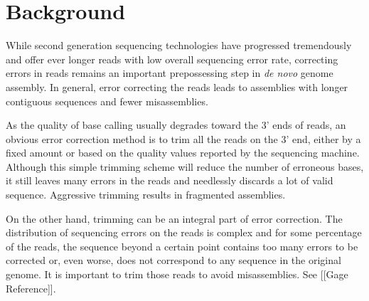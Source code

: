 \documentclass[10pt]{bmc_article}
\newenvironment{bmcformat}{\fussy\setboolean{publ}{true}}{\fussy}
\begin{document}
\begin{bmcformat}




\section*{Background}
While second generation sequencing technologies have progressed tremendously and offer ever longer reads with low overall sequencing error rate, correcting errors in reads remains an important prepossessing step in \emph{de novo} genome assembly.
In general, error correcting the reads leads to assemblies with longer contiguous sequences and fewer misassemblies.


As the quality of base calling usually degrades toward the 3' ends of reads, an obvious error correction method is to trim all the reads on the 3' end, either by a fixed amount or based on the quality values reported by the sequencing machine.
Although this simple trimming scheme will reduce the number of erroneous bases, it still leaves many errors in the reads and needlessly discards a lot of valid sequence. 
Aggressive trimming results in fragmented assemblies.

On the other hand, trimming can be an integral part of error correction.
The distribution of sequencing errors on the reads is complex and for some percentage of the reads, the sequence beyond a certain point contains too many errors to be corrected or, even worse, does not correspond to any sequence in the original genome.
It is important to trim those reads to avoid misassemblies.
See [[Gage Reference]].


\end{bmcformat}
\end{document}
